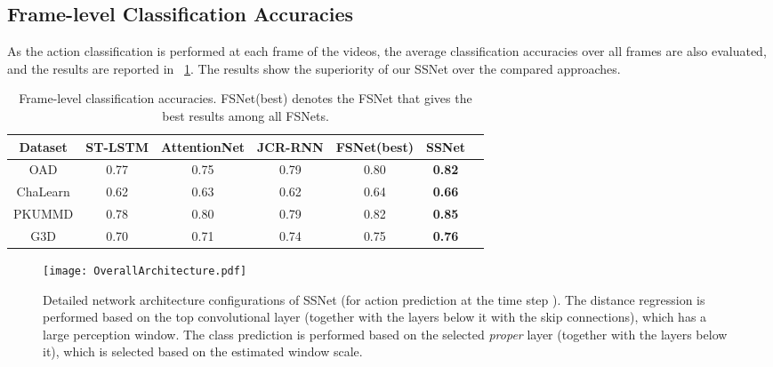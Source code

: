 \documentclass[10pt,twocolumn,letterpaper]{article}
\begin{document}
\subsection{Frame-level Classification Accuracies}
\label{sec:experiment:framelevel}


As the action classification is performed at each frame of the videos,
the average classification accuracies over all frames are also evaluated, and the results are reported in \tablename{~\ref{table:resultAvgacc}}.
The results show the superiority of our SSNet over the compared approaches.

\begin{table}[tbp]
	\caption{Frame-level classification accuracies. FSNet(best) denotes the FSNet that gives the best results among all FSNets.}
	\label{table:resultAvgacc}
	\scriptsize
	\begin{tabular}{ccccccc}
		\toprule
		Dataset          &  ST-LSTM      & AttentionNet     & JCR-RNN     &  FSNet(best)  & SSNet        \\
		\midrule
		OAD              &   0.77        &    0.75          &  0.79       &    0.80       &   \textbf{0.82}      \\
        ChaLearn         &   0.62        &    0.63          &  0.62       &    0.64       &   \textbf{0.66}       \\
        PKUMMD           &   0.78        &   0.80           &  0.79       &    0.82       &   \textbf{0.85}     \\
		G3D              &   0.70        &   0.71           &  0.74       &    0.75       &   \textbf{0.76}    \\
		\bottomrule
	\end{tabular}
\end{table}





\begin{figure*}[tbp]
\centering
	\centerline{\texttt{[image: OverallArchitecture.pdf]}}
    \centering
    \caption{
        Detailed network architecture configurations of SSNet (for action prediction at the time step ).
        The distance regression is performed based on the top convolutional layer (together with the layers below it with the skip connections), which has a large perception window.
        The class prediction is performed based on the selected \emph{proper} layer (together with the layers below it), which is selected based on the estimated window scale.
    }
	\label{fig:overallarchit}
\end{figure*}
\end{document}
